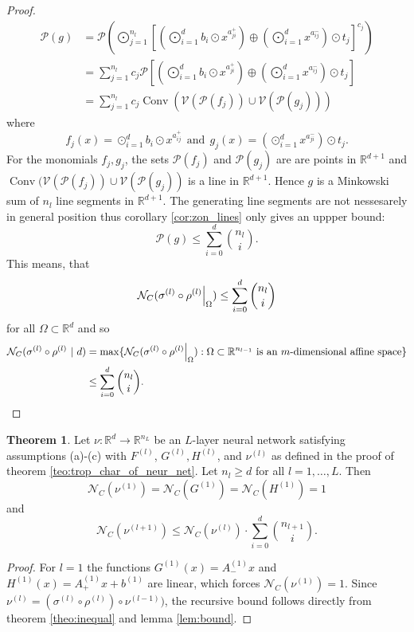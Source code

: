 \documentclass{article}
\theoremstyle{definition}
\newtheorem{theorem}{Theorem}[section]
\DeclareMathOperator{\Conv}{Conv}
\newcommand\restr[2]{{%
  \left.\kern-\nulldelimiterspace %
  #1 %
  \right|_{#2} %
  }}
\begin{document}
\begin{proof}
\begin{align*}
\mathcal{P}(g) &= \mathcal{P}\left(\displaystyle\bigodot_{j=1}^{n_l}\left[\left(\displaystyle\bigodot^{d}_{i=1}b_i \odot x^{a^{+}_{ji}}\right) \oplus \left( \displaystyle\bigodot_{i=1}^{d} x^{a_{ij}^{-}} \right) \odot t_j\right]^{c_j}\right) \\
&= \displaystyle\sum_{j=1}^{n_l}c_j \mathcal{P}\left[\left(\displaystyle\bigodot^{d}_{i=1}b_i \odot x^{a^{+}_{ji}}\right) \oplus \left( \displaystyle\bigodot_{i=1}^{d} x^{a_{ij}^{-}} \right) \odot t_j\right] \\
&= \displaystyle\sum_{j=1}^{n_l}c_j \Conv(\mathcal{V}(\mathcal{P}(f_j)) \cup \mathcal{V}(\mathcal{P}(g_j)))
\end{align*}
where
$$f_j(x)=\displaystyle\odot^{d}_{i=1}b_i \odot x^{a_{ij}^{+}} \ \ \text{and} \ \ g_j(x)= \left( \displaystyle\odot^{d}_{i=1} x^{a_{ji}^{-}} \right) \odot t_j.$$
For the monomials $f_j, g_j$, the sets $\mathcal{P}(f_j)$ and $\mathcal{P}(g_j)$ are are points in $\mathbb{R}^{d+1}$ and $\Conv(\mathcal{V}(\mathcal{P}(f_j)) \cup \mathcal{V}(\mathcal{P}(g_j))$ is a line in $\mathbb{R}^{d+1}$. Hence $g$ is a Minkowski sum of $n_l$ line segments in $\mathbb{R}^{d+1}$. The generating line segments are not nessesarely in general position thus corollary \ref{cor:zon_lines} only gives an uppper bound:
$$\mathcal{P}(g) \leq \displaystyle\sum^{d}_{i=0} \binom{n_l}{i}.$$
This means, that
$$\mathcal{N}_{C}(\restr{\sigma^{(l)} \circ \rho^{(l)}}{\Omega}) \leq \displaystyle\sum^{d}_{i=0} \binom{n_l}{i}$$
for all $\Omega \subset \mathbb{R}^{d}$ and so
\begin{align*}
\mathcal{N}_{C}(\sigma^{(l)} \circ \rho^{(l)} \ | \ d) 
&= \max\{\mathcal{N}_C(\restr{\sigma^{(l)} \circ \rho^{(l)}}{\Omega}):\Omega \subset \mathbb{R}^{n_{l-1}} \ \text{is an} \ m \text{-dimensional affine space}\} \\
&\leq \displaystyle\sum^{d}_{i=0} \binom{n_l}{i}.
\end{align*}
\end{proof}

\begin{theorem}\hspace{1sp}\cite{maclagan2015introduction}\label{theo:end_theo_proof}
Let $\nu : \mathbb{R}^{d} \to \mathbb{R}^{n_L}$ be an $L$-layer neural network satisfying assumptions (a)-(c) with $F^{(l)}$, $G^{(l)}, H^{(l)}$, and $\nu^{(l)}$ as defined in the proof of theorem \ref{teo:trop_char_of_neur_net}. Let $n_l \geq d$ for all $l= 1, \dots , L$. Then
$$\mathcal{N}_C(\nu^{(1)}) = \mathcal{N}_C(G^{(1)}) = \mathcal{N}_C(H^{(1)}) = 1$$
and
$$\mathcal{N}_C(\nu^{(l+1)}) \leq \mathcal{N}_C(\nu^{(l)}) \cdot \displaystyle\sum_{i=0}^{d}\binom{n_{l+1}}{i}.$$
\end{theorem}
\begin{proof}
For $l=1$ the functions $G^{(1)}(x) = A^{(1)}_{-}x$ and $H^{(1)}(x)=A^{(1)}_{+}x + b^{(1)}$ are linear, which forces $\mathcal{N}_{C}(\nu^{(1)})=1$. Since $\nu^{(l)}=(\sigma^{(l)} \circ \rho^{(l)}) \circ \nu^{(l-1)})$, the recursive bound follows directly from theorem \ref{theo:inequal} and lemma \ref{lem:bound}.
\end{proof}
\end{document}
